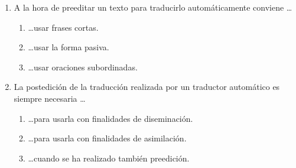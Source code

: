 \begin{enumerate}
\item A la hora de preeditar un texto para traducirlo automáticamente conviene \ldots\begin{enumerate} \item \ldots usar frases cortas. \item \ldots usar la forma pasiva. \item \ldots usar oraciones subordinadas. \end{enumerate} 

\item La postedición de la traducción realizada por un traductor automático es siempre necesaria \ldots\begin{enumerate} \item \ldots para usarla con finalidades de diseminación. \item \ldots para usarla con finalidades de asimilación. \item\ldots cuando se ha realizado también preedición. \end{enumerate} \end{enumerate} 

